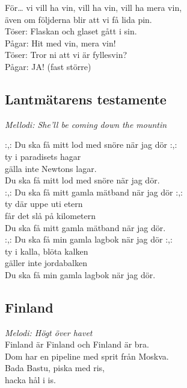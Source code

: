 \documentclass[a5paper]{article}
\begin{document}
		\noindent
		För… vi vill ha vin, vill ha vin, vill ha mera vin, \\
		även om följderna blir att vi få lida pin. \\
		Töser: Flaskan och glaset gått i sin. \\
		Pågar: Hit med vin, mera vin! \\
		Töser: Tror ni att vi är fyllesvin? \\
		Pågar: JA! (fast större) \\
				
		\newpage
		
		
\subsection{Lantmätarens testamente}
\textit{Mellodi: She'll be coming down the mountin} \\

\noindent

\noindent
:,: Du ska få mitt lod med snöre när jag dör :,: \\
ty i paradisets hagar \\
gälla inte Newtons lagar.\\
Du ska få mitt lod med snöre när jag dör. \\

\noindent
:,: Du ska få mitt gamla mätband när jag dör :,: \\
ty där uppe uti etern \\
får det slå på kilometern \\
Du ska få mitt gamla mätband när jag dör. \\

\noindent
:,: Du ska få min gamla lagbok när jag dör :,: \\
ty i kalla, blöta kalken \\
gäller inte jordabalken \\
Du ska få min gamla lagbok när jag dör. \\

\newpage

\subsection{Finland}
\textit{Melodi: Högt över havet} \\

\noindent 
Finland är Finland och Finland är bra. \\
Dom har en pipeline med sprit från Moskva. \\
Bada Bastu, piska med ris, \\
hacka hål i is. \\
\end{document}
